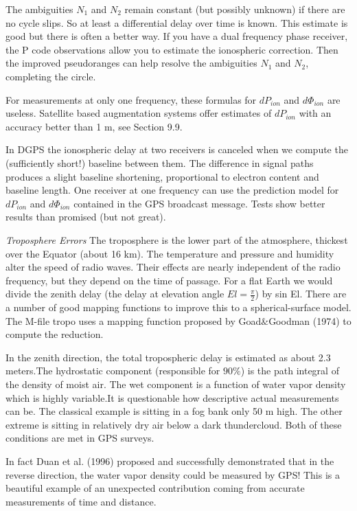 		The ambiguities $N_1$ and $N_2$ remain constant (but possibly unknown) if there are no cycle slips. So at least a differential delay over time is known. This estimate is good but there is often a better way. If you have a dual frequency phase receiver, the P code observations allow you to estimate the ionospheric correction. Then the improved pseudoranges can help resolve the ambiguities $N_1$ and $N_2$, completing the circle.
		
		For measurements at only one frequency, these formulas for $dP_{ion}$ and $d\Phi_{ion}$ are useless. Satellite based augmentation systems offer estimates of $dP_{ion}$ with an accuracy better than 1 m, see Section 9.9.
		
		In DGPS the ionospheric delay at two receivers is canceled when we compute the (sufficiently short!) baseline between them. The difference in signal paths produces a slight baseline shortening, proportional to electron content and baseline length. One receiver at one frequency can use the prediction model for $dP_{ion}$ and $d\Phi_{ion}$ contained in the GPS broadcast message. Tests show better results than promised (but not great).
		
		\textit{Troposphere Errors} The troposphere is the lower part of the atmosphere, thickest over the Equator (about 16 km). The temperature and pressure and humidity alter the speed of radio waves. Their effects are nearly independent of the radio frequency, but they depend on the time of passage. For a flat Earth we would divide the zenith delay (the delay at elevation angle $El=\frac{\pi}{2}$) by sin El. There are a number of good mapping functions to improve this to a spherical-surface model. The M-file tropo uses a mapping function proposed by Goad$\&$Goodman (1974) to compute the reduction.
		
		In the zenith direction, the total tropospheric delay is estimated as about 2.3 meters.The hydrostatic component (responsible for $90\%$) is the path integral of the density of moist air. The wet component is a function of water vapor density which is highly variable.It is questionable how descriptive actual measurements can be. The classical example is sitting in a fog bank only 50 m high. The other extreme is sitting in relatively dry air below a dark thundercloud. Both of these conditions are met in GPS surveys.
		
		In fact Duan et al. (1996) proposed and successfully demonstrated that in the reverse direction, the water vapor density could be measured by GPS! This is a beautiful example of an unexpected contribution coming from accurate measurements of time and distance.
		
